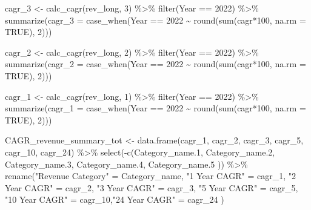 \documentclass[
  letterpaper,
  DIV=11,
  numbers=noendperiod]{scrreport}
\newenvironment{Shaded}{\begin{snugshade}}{\end{snugshade}}
\newcommand{\AttributeTok}[1]{\textcolor[rgb]{0.40,0.45,0.13}{#1}}
\newcommand{\ConstantTok}[1]{\textcolor[rgb]{0.56,0.35,0.01}{#1}}
\newcommand{\DecValTok}[1]{\textcolor[rgb]{0.68,0.00,0.00}{#1}}
\newcommand{\FloatTok}[1]{\textcolor[rgb]{0.68,0.00,0.00}{#1}}
\newcommand{\FunctionTok}[1]{\textcolor[rgb]{0.28,0.35,0.67}{#1}}
\newcommand{\NormalTok}[1]{\textcolor[rgb]{0.00,0.23,0.31}{#1}}
\newcommand{\OtherTok}[1]{\textcolor[rgb]{0.00,0.23,0.31}{#1}}
\newcommand{\SpecialCharTok}[1]{\textcolor[rgb]{0.37,0.37,0.37}{#1}}
\newcommand{\StringTok}[1]{\textcolor[rgb]{0.13,0.47,0.30}{#1}}
\begin{document}
\begin{Shaded}
\begin{Highlighting}[]
\NormalTok{cagr\_3 }\OtherTok{\textless{}{-}} \FunctionTok{calc\_cagr}\NormalTok{(rev\_long, }\DecValTok{3}\NormalTok{) }\SpecialCharTok{\%\textgreater{}\%} 
  \FunctionTok{filter}\NormalTok{(Year }\SpecialCharTok{==} \DecValTok{2022}\NormalTok{) }\SpecialCharTok{\%\textgreater{}\%}
  \FunctionTok{summarize}\NormalTok{(}\AttributeTok{cagr\_3 =} \FunctionTok{case\_when}\NormalTok{(Year }\SpecialCharTok{==} \DecValTok{2022} \SpecialCharTok{\textasciitilde{}} \FunctionTok{round}\NormalTok{(}\FunctionTok{sum}\NormalTok{(cagr}\SpecialCharTok{*}\DecValTok{100}\NormalTok{, }\AttributeTok{na.rm =} \ConstantTok{TRUE}\NormalTok{), }\DecValTok{2}\NormalTok{)))}

\NormalTok{cagr\_2 }\OtherTok{\textless{}{-}} \FunctionTok{calc\_cagr}\NormalTok{(rev\_long, }\DecValTok{2}\NormalTok{) }\SpecialCharTok{\%\textgreater{}\%} 
  \FunctionTok{filter}\NormalTok{(Year }\SpecialCharTok{==} \DecValTok{2022}\NormalTok{) }\SpecialCharTok{\%\textgreater{}\%}
  \FunctionTok{summarize}\NormalTok{(}\AttributeTok{cagr\_2 =} \FunctionTok{case\_when}\NormalTok{(Year }\SpecialCharTok{==} \DecValTok{2022} \SpecialCharTok{\textasciitilde{}} \FunctionTok{round}\NormalTok{(}\FunctionTok{sum}\NormalTok{(cagr}\SpecialCharTok{*}\DecValTok{100}\NormalTok{, }\AttributeTok{na.rm =} \ConstantTok{TRUE}\NormalTok{), }\DecValTok{2}\NormalTok{)))}

\NormalTok{ cagr\_1 }\OtherTok{\textless{}{-}} \FunctionTok{calc\_cagr}\NormalTok{(rev\_long, }\DecValTok{1}\NormalTok{) }\SpecialCharTok{\%\textgreater{}\%} 
  \FunctionTok{filter}\NormalTok{(Year }\SpecialCharTok{==} \DecValTok{2022}\NormalTok{) }\SpecialCharTok{\%\textgreater{}\%}
  \FunctionTok{summarize}\NormalTok{(}\AttributeTok{cagr\_1 =} \FunctionTok{case\_when}\NormalTok{(Year }\SpecialCharTok{==} \DecValTok{2022} \SpecialCharTok{\textasciitilde{}} \FunctionTok{round}\NormalTok{(}\FunctionTok{sum}\NormalTok{(cagr}\SpecialCharTok{*}\DecValTok{100}\NormalTok{, }\AttributeTok{na.rm =} \ConstantTok{TRUE}\NormalTok{), }\DecValTok{2}\NormalTok{)))}

\NormalTok{CAGR\_revenue\_summary\_tot }\OtherTok{\textless{}{-}} \FunctionTok{data.frame}\NormalTok{(cagr\_1, cagr\_2, cagr\_3, cagr\_5, cagr\_10, cagr\_24) }\SpecialCharTok{\%\textgreater{}\%}   
  \FunctionTok{select}\NormalTok{(}\SpecialCharTok{{-}}\FunctionTok{c}\NormalTok{(Category\_name}\FloatTok{.1}\NormalTok{, Category\_name}\FloatTok{.2}\NormalTok{, Category\_name}\FloatTok{.3}\NormalTok{, Category\_name}\FloatTok{.4}\NormalTok{, Category\_name}\FloatTok{.5}\NormalTok{ )) }\SpecialCharTok{\%\textgreater{}\%} 
  \FunctionTok{rename}\NormalTok{(}\StringTok{"Revenue Category"} \OtherTok{=}\NormalTok{ Category\_name, }\StringTok{"1 Year CAGR"} \OtherTok{=}\NormalTok{ cagr\_1, }\StringTok{"2 Year CAGR"} \OtherTok{=}\NormalTok{ cagr\_2, }\StringTok{"3 Year CAGR"} \OtherTok{=}\NormalTok{ cagr\_3, }\StringTok{"5 Year CAGR"} \OtherTok{=}\NormalTok{ cagr\_5, }\StringTok{"10 Year CAGR"} \OtherTok{=}\NormalTok{ cagr\_10,}\StringTok{"24 Year CAGR"} \OtherTok{=}\NormalTok{ cagr\_24 )}


\end{Highlighting}
\end{Shaded}
\end{document}
